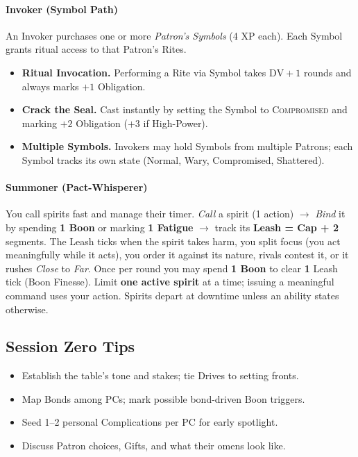 \paragraph{Invoker (Symbol Path)}
An Invoker purchases one or more \emph{Patron’s Symbols} (4 XP each). Each Symbol grants ritual access to that Patron’s Rites. 
\begin{itemize}
  \item \textbf{Ritual Invocation.} Performing a Rite via Symbol takes $\text{DV} + 1$ rounds and always marks $+1$ Obligation. 
  \item \textbf{Crack the Seal.} Cast instantly by setting the Symbol to \textsc{Compromised} and marking $+2$ Obligation ($+3$ if High-Power). 
  \item \textbf{Multiple Symbols.} Invokers may hold Symbols from multiple Patrons; each Symbol tracks its own state (Normal, Wary, Compromised, Shattered). 
\end{itemize}

\paragraph{Summoner (Pact-Whisperer)}
You call spirits fast and manage their timer. \emph{Call} a spirit (1 action) $\rightarrow$ \emph{Bind} it by spending \textbf{1 Boon} or marking \textbf{1 Fatigue} $\rightarrow$ track its \textbf{Leash = Cap + 2} segments. The Leash ticks when the spirit takes harm, you split focus (you act meaningfully while it acts), you order it against its nature, rivals contest it, or it rushes \emph{Close} to \emph{Far}. Once per round you may spend \textbf{1 Boon} to clear \textbf{1} Leash tick (Boon Finesse). Limit \textbf{one active spirit} at a time; issuing a meaningful command uses your action. Spirits depart at downtime unless an ability states otherwise.

\subsection{Session Zero Tips}
\begin{itemize}
  \item Establish the table’s tone and stakes; tie Drives to setting fronts.
  \item Map Bonds among PCs; mark possible bond-driven Boon triggers.
  \item Seed 1--2 personal Complications per PC for early spotlight.
  \item Discuss Patron choices, Gifts, and what their omens look like.
\end{itemize}